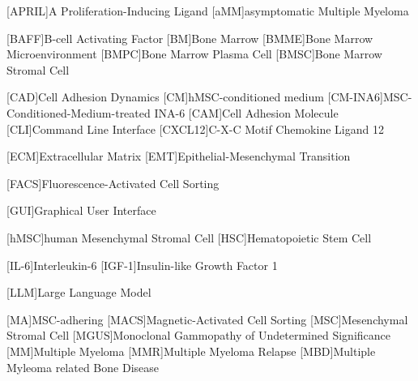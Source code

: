 
%
\vspace{-\vfull}
\label{sec:Abbreviations}%
{%
    \footnotesize%
    \begin{spacing}{-.0}%
        \begin{acronym}%
            [APRIL]{A Proliferation-Inducing Ligand} %
            [aMM]{asymptomatic Multiple Myeloma}

            [BAFF]{B-cell Activating Factor}
            [BM]{Bone Marrow}
            [BMME]{Bone Marrow Microenvironment}
            [BMPC]{Bone Marrow Plasma Cell}
            [BMSC]{Bone Marrow Stromal Cell}

            [CAD]{Cell Adhesion Dynamics}
            [CM]{hMSC-conditioned medium}
            [CM-INA6]{MSC-Conditioned-Medium-treated INA-6}
            [CAM]{Cell Adhesion Molecule}
            [CLI]{Command Line Interface}
            [CXCL12]{C-X-C Motif Chemokine Ligand 12}

            [ECM]{Extracellular Matrix}
            [EMT]{Epithelial-Mesenchymal Transition}

            [FACS]{Fluorescence-Activated Cell Sorting}

            [GUI]{Graphical User Interface}

            [hMSC]{human Mesenchymal Stromal Cell}
            [HSC]{Hematopoietic Stem Cell}

            [IL-6]{Interleukin-6}
            [IGF-1]{Insulin-like Growth Factor 1}
            
            [LLM]{Large Language Model}

            [MA]{MSC-adhering}
            [MACS]{Magnetic-Activated Cell Sorting}
            [MSC]{Mesenchymal Stromal Cell}
            [MGUS]{Monoclonal Gammopathy of Undetermined Significance}
            [MM]{Multiple Myeloma}
            [MMR]{Multiple Myeloma Relapse}
            [MBD]{Multiple Myleoma related Bone Disease}


\end{acronym}
\end{spacing}}
